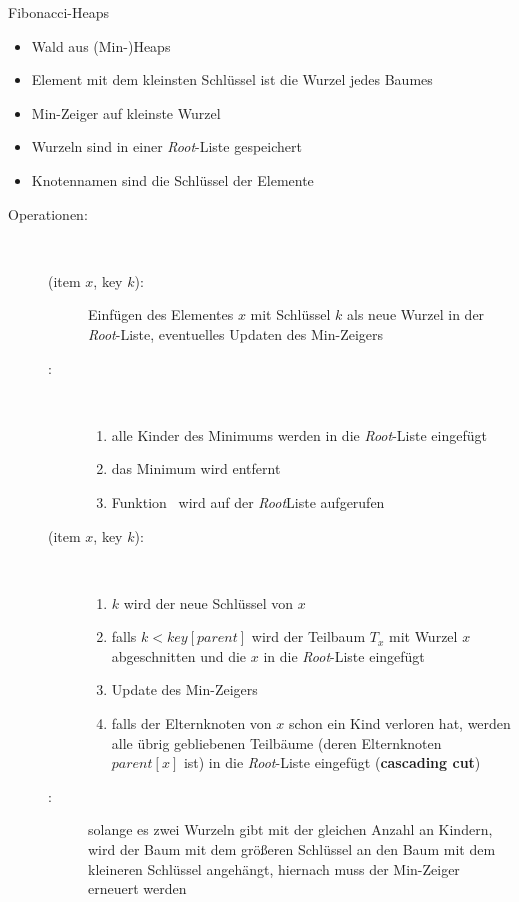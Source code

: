 \begin{TOP}{Fibonacci-Heaps}
\up\up\begin{itemize}
	\item Wald aus (Min-)Heaps
	\item Element mit dem kleinsten Schlüssel ist die Wurzel jedes Baumes
	\item Min-Zeiger auf kleinste Wurzel
	\item Wurzeln sind in einer \textit{Root}-Liste gespeichert
	\item Knotennamen sind die Schlüssel der Elemente
\end{itemize}

\begin{description}
	\item[Operationen:]\ \\\up
	\begin{description}
		\item[\insert(item $x$, key $k$):] Einfügen des Elementes $x$ mit Schlüssel $k$ als neue Wurzel in der \textit{Root}-Liste, eventuelles Updaten des Min-Zeigers
		\item[\exMin:]\ \\\up
			\begin{enumerate}
				\item alle Kinder des Minimums werden in die \textit{Root}-Liste eingefügt
				\item das Minimum wird entfernt
				\item Funktion \cons~wird auf der \textit{Root}Liste aufgerufen
			\end{enumerate}
		\item[\decKey(item $x$, key $k$):] \ \\\up
			\begin{enumerate}
				\item $k$ wird der neue Schlüssel von $x$
				\item falls $k<key[parent]$ wird der Teilbaum $T_x$ mit Wurzel $x$ abgeschnitten und die $x$ in die \textit{Root}-Liste eingefügt
				\item Update des Min-Zeigers
				\item falls der Elternknoten von $x$ schon ein Kind verloren hat, werden alle übrig gebliebenen Teilbäume (deren Elternknoten $parent[x]$ ist) in die \textit{Root}-Liste eingefügt (\textbf{cascading cut})
			\end{enumerate}
		\item[\cons:] solange es zwei Wurzeln gibt mit der gleichen Anzahl an Kindern, wird der Baum mit dem größeren Schlüssel an den Baum mit dem kleineren Schlüssel angehängt, hiernach muss der Min-Zeiger erneuert werden\\
	\end{description}
\end{description}
\end{TOP}